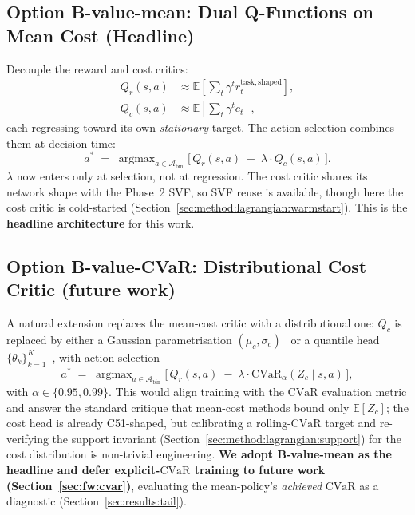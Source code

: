 \documentclass[11pt,a4paper]{report}
\newcommand{\cvar}{\ensuremath{\mathrm{CVaR}}}
\begin{document}
\subsection{Option B-value-mean: Dual Q-Functions on Mean Cost (Headline)}
\label{sec:method:lagrangian:Bmean}

Decouple the reward and cost critics:
\begin{align}
  Q_r(s,a) &\approx \mathbb{E}\!\left[\sum_t \gamma^t r^{\mathrm{task,shaped}}_t\right], \\
  Q_c(s,a) &\approx \mathbb{E}\!\left[\sum_t \gamma^t c_t\right],
\end{align}
each regressing toward its own \emph{stationary} target. The action
selection combines them at decision time:
\begin{equation}
  a^* \;=\; \mathop{\mathrm{argmax}}_{a \in \mathcal{A}_{\mathrm{bin}}}
  \Big[\,Q_r(s,a) \;-\; \lambda \cdot Q_c(s,a)\,\Big].
  \label{eq:Bmean-select}
\end{equation}
$\lambda$ now enters only at selection, not at regression. The
cost critic shares its network shape with the Phase~2 SVF, so SVF
reuse is available, though here the cost critic is cold-started
(Section~\ref{sec:method:lagrangian:warmstart}). This is the
\textbf{headline architecture} for this work.


\subsection{Option B-value-CVaR: Distributional Cost Critic (future work)}
\label{sec:method:lagrangian:Bcvar}

A natural extension replaces the mean-cost critic with a
distributional one: $Q_c$ is replaced by either a Gaussian
parametrisation $(\mu_c, \sigma_c)$~\cite{yang2021wcsac} or a
quantile head $\{\theta_k\}_{k=1}^K$~\cite{dabney2018qrdqn}, with
action selection
\begin{equation}
  a^* \;=\; \mathop{\mathrm{argmax}}_{a \in \mathcal{A}_{\mathrm{bin}}}
  \Big[\,Q_r(s,a) \;-\; \lambda \cdot \cvar_{\alpha}(Z_c \mid s, a)\,\Big],
\end{equation}
with $\alpha \in \{0.95, 0.99\}$. This would align training with the
\cvar{} evaluation metric and answer the standard critique that
mean-cost methods bound only $\mathbb{E}[Z_c]$; the cost head is
already C51-shaped, but calibrating a rolling-\cvar{} target and
re-verifying the support invariant
(Section~\ref{sec:method:lagrangian:support}) for the cost
distribution is non-trivial engineering. \textbf{We adopt
B-value-mean as the headline and defer explicit-\cvar{} training to
future work (Section~\ref{sec:fw:cvar})}, evaluating the
mean-policy's \emph{achieved} \cvar{} as a diagnostic
(Section~\ref{sec:results:tail}).
\end{document}

